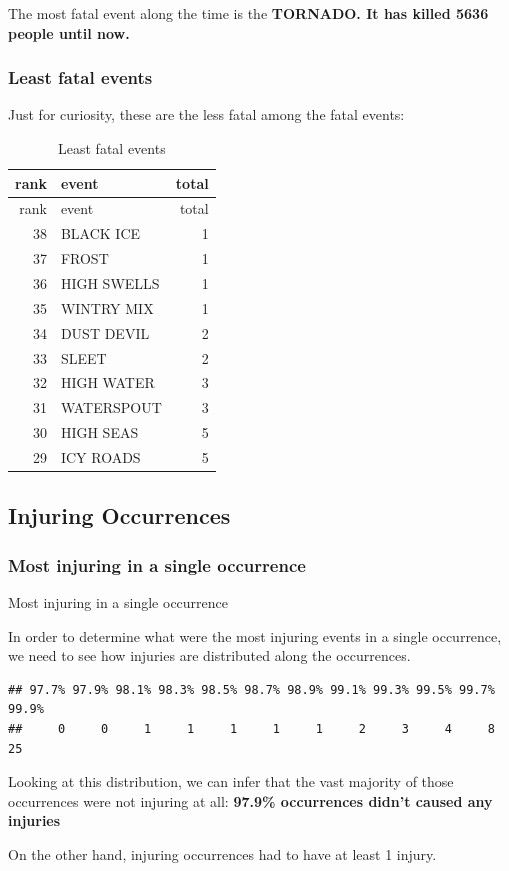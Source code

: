 The most fatal event along the time is the \textbf{TORNADO. It has
killed 5636 people until now.}

\subsubsection{Least fatal events}\label{least-fatal-events}

Just for curiosity, these are the less fatal among the fatal events:

\suppressfloats
\begin{longtable}[]{@{}rlr@{}}
\caption{Least fatal events}\tabularnewline
\toprule
rank & event & total\tabularnewline
\midrule
\endfirsthead
\toprule
rank & event & total\tabularnewline
\midrule
\endhead
38 & BLACK ICE & 1\tabularnewline
37 & FROST & 1\tabularnewline
36 & HIGH SWELLS & 1\tabularnewline
35 & WINTRY MIX & 1\tabularnewline
34 & DUST DEVIL & 2\tabularnewline
33 & SLEET & 2\tabularnewline
32 & HIGH WATER & 3\tabularnewline
31 & WATERSPOUT & 3\tabularnewline
30 & HIGH SEAS & 5\tabularnewline
29 & ICY ROADS & 5\tabularnewline
\bottomrule
\end{longtable}

\subsection{Injuring Occurrences}\label{injuring-occurrences}

\subsubsection{Most injuring in a single
occurrence}\label{most-injuring-in-a-single-occurrence}

Most injuring in a single occurrence

In order to determine what were the most injuring events in a single
occurrence, we need to see how injuries are distributed along the
occurrences.

\begin{verbatim}
## 97.7% 97.9% 98.1% 98.3% 98.5% 98.7% 98.9% 99.1% 99.3% 99.5% 99.7% 99.9% 
##     0     0     1     1     1     1     1     2     3     4     8    25
\end{verbatim}

Looking at this distribution, we can infer that the vast majority of
those occurrences were not injuring at all: \textbf{97.9\% occurrences
didn't caused any injuries}

On the other hand, injuring occurrences had to have at least 1 injury.

